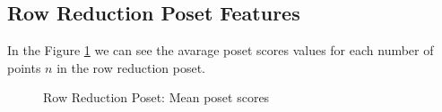\documentclass{article}
\begin{document}
\subsection{Row Reduction Poset Features}
\par In the Figure \ref{fig:scores_poset_mean_rrp} we can see the avarage poset scores values for each number of points $n$ in the row reduction poset.
\begin{figure}[ht]
  \vspace{-96pt}
  \centering
  \hspace*{-0.18999999999999995\textwidth}
  \caption{Row Reduction Poset: Mean poset scores}
  \label{fig:scores_poset_mean_rrp}
\end{figure}
\end{document}
